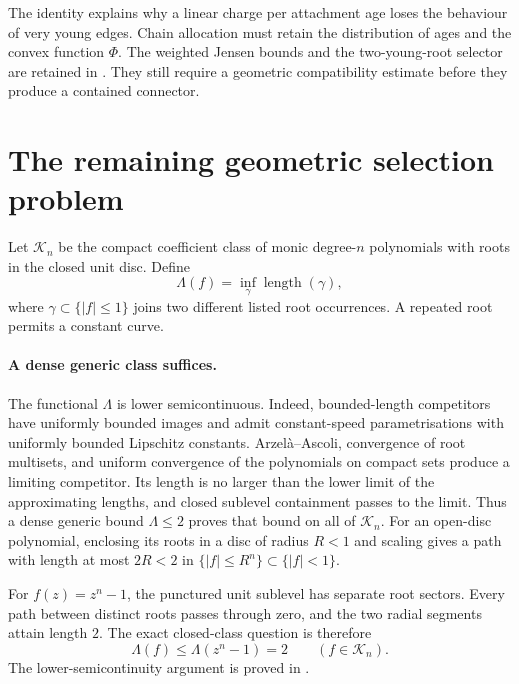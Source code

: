 \documentclass[11pt]{article}
\begin{document}
The identity explains why a linear charge per attachment age loses the
behaviour of very young edges.  Chain allocation must retain the distribution
of ages and the convex function $\Phi$.  The weighted Jensen bounds and the
two-young-root selector are retained in
.
They still require a geometric compatibility estimate before they produce a
contained connector.

\section{The remaining geometric selection problem}\label{sec:open}

Let $\mathcal K_n$ be the compact coefficient class of monic degree-$n$
polynomials with roots in the closed unit disc.  Define
\[
 \Lambda(f)=\inf_\gamma\operatorname{length}(\gamma),
\]
where $\gamma\subset\{|f|\le1\}$ joins two different listed root
occurrences.  A repeated root permits a constant curve.

\paragraph{A dense generic class suffices.}
The functional $\Lambda$ is lower semicontinuous.  Indeed, bounded-length
competitors have uniformly bounded images and admit constant-speed
parametrisations with uniformly bounded Lipschitz constants.  Arzel\`a--Ascoli,
convergence of root multisets, and uniform convergence of the polynomials on
compact sets produce a limiting competitor.  Its length is no larger than
the lower limit of the approximating lengths, and closed sublevel containment
passes to the limit.  Thus a dense generic bound $\Lambda\le2$ proves that
bound on all of $\mathcal K_n$.  For an open-disc polynomial, enclosing its
roots in a disc of radius $R<1$ and scaling gives a path with length at most
$2R<2$ in $\{|f|\le R^n\}\subset\{|f|<1\}$.

For $f(z)=z^n-1$, the punctured unit sublevel has separate root sectors.
Every path between distinct roots passes through zero, and the two radial
segments attain length $2$.  The exact closed-class question is therefore
\[
 \boxed{\Lambda(f)\le\Lambda(z^n-1)=2\qquad(f\in\mathcal K_n).}
\]
The lower-semicontinuity argument is proved in
.
\end{document}
